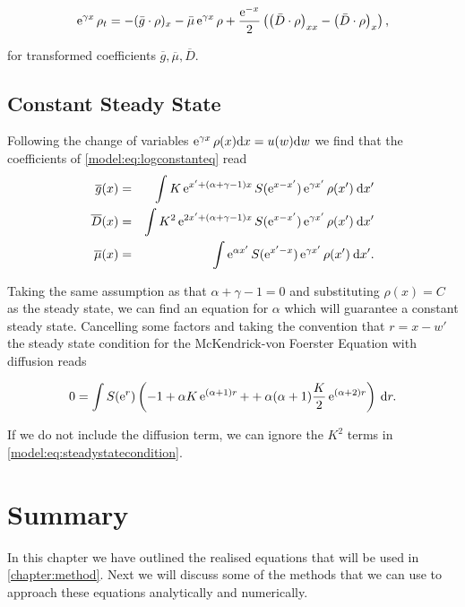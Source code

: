 \documentclass[../main]{subfiles}
\begin{document}
  \begin{equation} \label{model:eq:logconstanteq}
    \operatorname{e}^{\gamma x} \rho_t = - (\bar{g} \cdot \rho)_x - \bar{\mu} \operatorname{e}^{\gamma x} \rho + \frac{\operatorname{e}^{-x}}{2} \left( \left( \bar{D} \cdot \rho \right)_{xx} - \left( \bar{D} \cdot \rho \right)_x \right),
  \end{equation}

  for transformed coefficients $\overline{g}, \overline{\mu}, \overline{D}$.

  \subsection{Constant Steady State}
  Following the change of variables $\operatorname{e}^{\gamma x} \rho(x) \mathrm{d}x = u(w) \mathrm{d}w$ we find that the coefficients of \autoref{model:eq:logconstanteq} read
  \begin{eqnarray}
    \overline{g}(x)  &=& \int K \operatorname{e}^{x' + (\alpha + \gamma - 1) x} S(\operatorname{e}^{x - x'}) \operatorname{e}^{\gamma x'} \rho(x') \: \mathrm{d}x' \\
    \overline{D}(x)  &=& \int K^2 \operatorname{e}^{2x' + (\alpha + \gamma - 1) x} S(\operatorname{e}^{x - x'}) \operatorname{e}^{\gamma x'} \rho(x') \: \mathrm{d}x' \\
    \overline{\mu}(x) &=& \int \operatorname{e}^{\alpha x'} S(\operatorname{e}^{x' - x}) \operatorname{e}^{\gamma x'} \rho(x') \: \mathrm{d}x'.
  \end{eqnarray}

  Taking the same assumption as \cite{datta2011} that $\alpha + \gamma - 1 = 0$ and substituting $\rho(x) = C$ as the steady state, we can find an equation for $\alpha$ which will guarantee a constant steady state. Cancelling some factors and taking the convention that $r = x - w'$ the steady state condition for the McKendrick-von Foerster Equation with diffusion reads

  \begin{equation} \label{model:eq:steadystatecondition}
    0 = \int S(\operatorname{e}^{r}) \left(-1 + \alpha K \operatorname{e}^{(\alpha + 1)r} + + \alpha (\alpha + 1) \frac{K}{2} \operatorname{e}^{(\alpha + 2)r} \right) \: \mathrm{d}r.
  \end{equation}

  If we do not include the diffusion term, we can ignore the $K^2$ terms in \autoref{model:eq:steadystatecondition}.

  \section{Summary}
  In this chapter we have outlined the realised equations that will be used in \autoref{chapter:method}. Next we will discuss some of the methods that we can use to approach these equations analytically and numerically.
\end{document}

